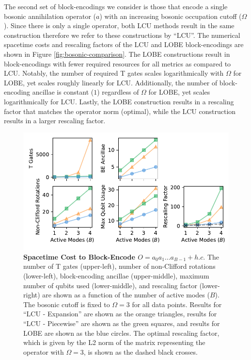 The second set of block-encodings we consider is those that encode a single bosonic annihilation operator ($a$) with an increasing bosonic occupation cutoff ($\Omega$).
Since there is only a single operator, both LCU methods result in the same construction therefore we refer to these constructions by ``LCU''.
The numerical spacetime costs and rescaling factors of the LCU and LOBE block-encodings are shown in Figure \ref{fig:bosonic-comparison}.
The LOBE constructions result in block-encodings with fewer required resources for all metrics as compared to LCU.
Notably, the number of required T gates scales logarithmically with $\Omega$ for LOBE, yet scales roughly linearly for LCU.
Additionally, the number of block-encoding ancillae is constant ($1$) regardless of $\Omega$ for LOBE, yet scales logarithmically for LCU.
Lastly, the LOBE construction results in a rescaling factor that matches the operator norm (optimal), while the LCU construction results in a larger rescaling factor.

\begin{figure}
    \centering
    \includegraphics[width=14cm]{figures/bosonic-hc-comparison.pdf}
    \caption{
        \textbf{Spacetime Cost to Block-Encode $O = a_0 a_1 \hdots a_{B-1} + h.c.$}
        The number of T gates (upper-left), number of non-Clifford rotations (lower-left), block-encoding ancillae (upper-middle), maximum number of qubits used (lower-middle), and rescaling factor (lower-right) are shown as a function of the number of active modes ($B$).
        The bosonic cutoff is fixed to $\Omega = 3$ for all data points.
        Results for ``LCU - Expansion'' are shown as the orange triangles, results for ``LCU - Piecewise'' are shown as the green squares, and results for LOBE are shown as the blue circles.
        The optimal rescaling factor, which is given by the L2 norm of the matrix representing the operator with $\Omega = 3$, is shown as the dashed black crosses.
    }
    \label{fig:bosonic-hc-comparison}
\end{figure}

